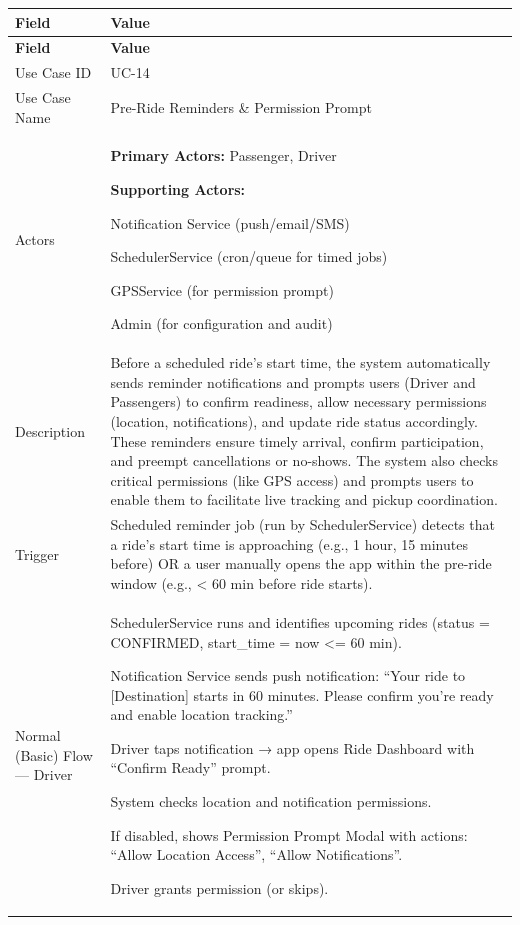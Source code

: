 \begin{longtable}{|p{3.5cm}|p{12cm}|}
\hline
\rowcolor{lightgray!30}
\textbf{Field} & \textbf{Value} \\
\hline
\endfirsthead
\hline
\rowcolor{lightgray!30}
\textbf{Field} & \textbf{Value} \\
\hline
\endhead
\hline
\endfoot
Use Case ID & UC-14 \\
\hline
Use Case Name & Pre-Ride Reminders \& Permission Prompt \\
\hline
Actors &
\textbf{Primary Actors:} Passenger, Driver

\textbf{Supporting Actors:}

Notification Service (push/email/SMS)

SchedulerService (cron/queue for timed jobs)

GPSService (for permission prompt)

Admin (for configuration and audit) \\
\hline
Description &
Before a scheduled ride’s start time, the system automatically sends reminder notifications and prompts users (Driver and Passengers) to confirm readiness, allow necessary permissions (location, notifications), and update ride status accordingly. These reminders ensure timely arrival, confirm participation, and preempt cancellations or no-shows. The system also checks critical permissions (like GPS access) and prompts users to enable them to facilitate live tracking and pickup coordination. \\
\hline
Trigger &
Scheduled reminder job (run by SchedulerService) detects that a ride’s start time is approaching (e.g., 1 hour, 15 minutes before) OR a user manually opens the app within the pre-ride window (e.g., < 60 min before ride starts). \\
\hline
Normal (Basic) Flow — Driver &
SchedulerService runs and identifies upcoming rides (status = CONFIRMED, start\_time = now <= 60 min).

Notification Service sends push notification: “Your ride to [Destination] starts in 60 minutes. Please confirm you’re ready and enable location tracking.”

Driver taps notification → app opens Ride Dashboard with “Confirm Ready” prompt.

System checks location and notification permissions.

If disabled, shows Permission Prompt Modal with actions: “Allow Location Access”, “Allow Notifications”.

Driver grants permission (or skips).


\end{longtable}
